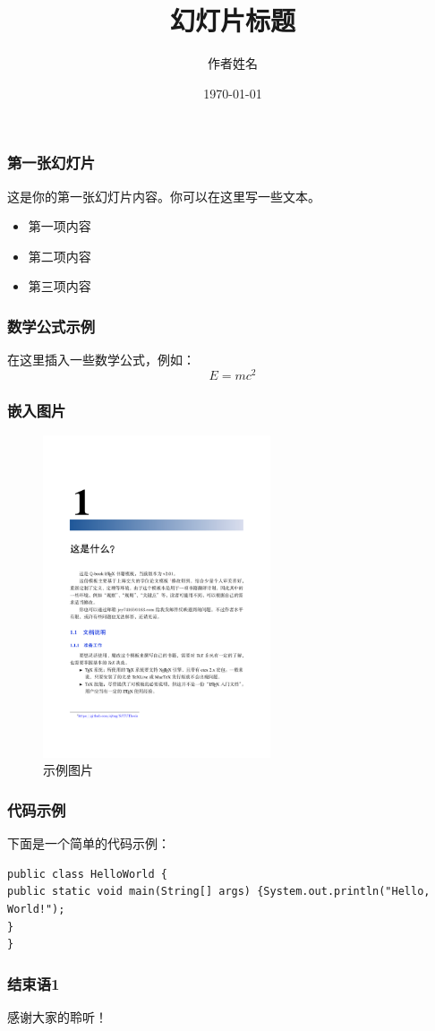 \documentclass[UTF8]{beamer}
\title{幻灯片标题}
\author{作者姓名}
\date{\today}
\begin{document}
\frame{\titlepage}  %

\begin{frame}
    \frametitle{第一张幻灯片}
    这是你的第一张幻灯片内容。你可以在这里写一些文本。
    
    \begin{itemize}
        \item 第一项内容
        \item 第二项内容
        \item 第三项内容
    \end{itemize}
\end{frame}

\begin{frame}
    \frametitle{数学公式示例}
    在这里插入一些数学公式，例如：
    \[
        E = mc^2
    \]
\end{frame}

\begin{frame}
    \frametitle{嵌入图片}
    \begin{figure}[h]
        \centering
        \includegraphics[width=0.6\textwidth]{9.png} %
        \caption{示例图片}
    \end{figure}
\end{frame}

\begin{frame}
    \frametitle{代码示例}
    下面是一个简单的代码示例：
    \begin{verbatim}
public class HelloWorld {
public static void main(String[] args) {System.out.println("Hello, World!");
}
}
    \end{verbatim}
\end{frame}

\begin{frame}
    \frametitle{结束语1}
    感谢大家的聆听！
\end{frame}
\end{document}
